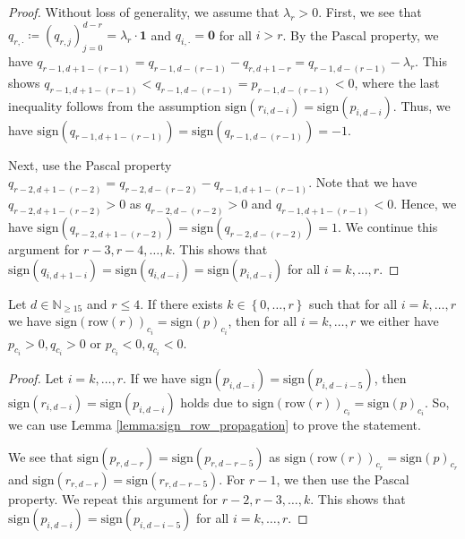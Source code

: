 \begin{proof}
    Without loss of generality, we assume that \( \lambda_r > 0 \).
    First, we see that \( q_{r, \cdot} \coloneqq (q_{r,j})_{j=0}^{d-r} = \lambda_r \cdot \mathbf{1} \) and \( q_{i,\cdot} =  \mathbf{0} \) for all \( i > r \). By the Pascal property, we have \( q_{r-1,d+1-(r-1)} = q_{r-1,d-(r-1)} - q_{r,d+1-r} = q_{r-1,d-(r-1)} - \lambda_r \).
    This shows \( q_{r-1,d+1-(r-1)} < q_{r-1,d-(r-1)} = p_{r-1,d-(r-1)} < 0 \), where the last inequality follows from the assumption $\mathrm{sign}(r_{i,d-i}) = \mathrm{sign}(p_{i,d-i})$. Thus, we have \( \mathrm{sign}(q_{r-1,d+1-(r-1)}) = \mathrm{sign}(q_{r-1,d-(r-1)}) = \mathbf -1\). 
    
    Next, use the Pascal property \( q_{r-2,d+1-(r-2)} = q_{r-2,d-(r-2)} - q_{r-1,d+1-(r-1)} \). Note that we have \( q_{r-2,d+1-(r-2)} > 0 \) as \( q_{r-2,d-(r-2)} > 0 \) and \( q_{r-1,d+1-(r-1)} < 0 \). Hence, we have \( \mathrm{sign}(q_{r-2,d+1-(r-2)}) = \mathrm{sign}(q_{r-2,d-(r-2)}) = 1 \). We continue this argument for \( r-3, r-4, \dots, k \). This shows that \( \mathrm{sign}(q_{i,d+1-i}) = \mathrm{sign}(q_{i,d-i}) = \mathrm{sign}(p_{i,d-i}) \) for all \( i = k, \dots, r\).
\end{proof}

\begin{lemma}\label{lemma:same_sign_propagation_easy}
    Let \( d \in \mathbb{N}_{\geq 15} \) and \( r \leq 4 \). If there exists \( k \in \left\{ 0, \dots, r \right\} \) such that for all \( i = k, \dots, r\) we have \(  \mathrm{sign}(\mathrm{row}(r))_{c_i} = \mathrm{sign}(p)_{c_i} \),
    then for all \( i = k, \dots, r\) we either have \( p_{c_i} > 0, q_{c_i} > 0 \) or \( p_{c_i} < 0, q_{c_i} < 0 \).
\end{lemma}
  
\begin{proof}
    Let \( i=k, \dots, r \). If we have \( \mathrm{sign}(p_{i,d-i}) = \mathrm{sign}(p_{i,d-i-5}) \), then $\mathrm{sign}(r_{i,d-i}) = \mathrm{sign}(p_{i,d-i})$ holds due to \( \mathrm{sign}(\mathrm{row}(r))_{c_i} = \mathrm{sign}(p)_{c_i} \). So, we can use Lemma \ref{lemma:sign_row_propagation} to prove the statement. 
    
    We see that \( \mathrm{sign}(p_{r,d-r}) = \mathrm{sign}(p_{r,d-r-5}) \) as \( \mathrm{sign}(\mathrm{row}(r))_{c_r} = \mathrm{sign}(p)_{c_r} \) and \( \mathrm{sign}(r_{r,d-r}) = \mathrm{sign}(r_{r, d - r - 5}) \). For \( r - 1 \), we then use the Pascal property. We repeat this argument for \( r-2, r-3, \dots, k \). This shows that \( \mathrm{sign}(p_{i,d-i}) = \mathrm{sign}(p_{i,d-i-5}) \) for all \( i = k, \dots, r \).
\end{proof}

